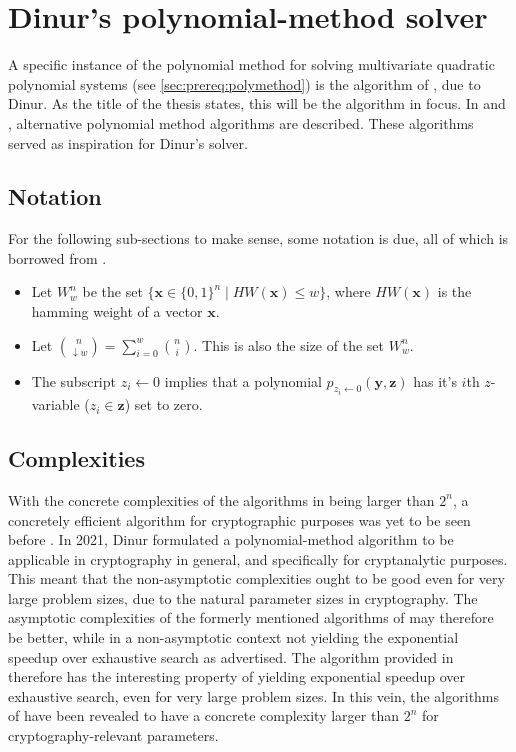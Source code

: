 \section{Dinur's polynomial-method solver} \label{sec:dinur}

A specific instance of the polynomial method for solving multivariate quadratic polynomial systems (see \cref{sec:prereq:polymethod}) is the algorithm of \cite{eurocrypt-2021-30841}, due to Dinur. As the title of the thesis states, this will be the algorithm in focus. In \cite{doi:10.1137/1.9781611974782.143} and \cite{Williams2014ThePM}, alternative polynomial method algorithms are described. These algorithms served as inspiration for Dinur's solver.

\subsection{Notation} \label{sec:dinur:notation}

For the following sub-sections to make sense, some notation is due, all of which is borrowed from \cite{eurocrypt-2021-30841}.
\begin{itemize}
    \item Let $W^n_w$ be the set $\{\mathbf{x} \in \{0, 1\}^n \mid HW(\mathbf{x}) \leq w \}$, where $HW(\mathbf{x})$ is the hamming weight of a vector $\mathbf{x}$. 
    \item Let $\binom{n}{\downarrow w} = \sum^w_{i = 0} \binom{n}{i}$. This is also the size of the set $W^n_w$.
    \item The subscript $z_i \leftarrow 0$ implies that a polynomial $p_{z_i \leftarrow 0}(\mathbf{y},\mathbf{z})$ has it's $i$th $z$-variable ($z_i \in \mathbf{z}$) set to zero.
\end{itemize}

\subsection{Complexities}

With the concrete complexities of the algorithms in \cite{doi:10.1137/1.9781611974782.143, Williams2014ThePM} being larger than $2^n$, a concretely efficient algorithm for cryptographic purposes was yet to be seen before \cite{eurocrypt-2021-30841}. In 2021, Dinur formulated a polynomial-method algorithm to be applicable in cryptography in general, and specifically for cryptanalytic purposes. This meant that the non-asymptotic complexities ought to be good even for very large problem sizes, due to the natural parameter sizes in cryptography. The asymptotic complexities of the formerly mentioned algorithms of \cite{doi:10.1137/1.9781611974782.143, Williams2014ThePM} may therefore be better, while in a non-asymptotic context not yielding the exponential speedup over exhaustive search as advertised. The algorithm provided in \cite{eurocrypt-2021-30841} therefore has the interesting property of yielding exponential speedup over exhaustive search, even for very large problem sizes. In this vein, the algorithms of \cite{doi:10.1137/1.9781611974782.143, Williams2014ThePM} have been revealed to have a concrete complexity larger than $2^n$ for cryptography-relevant parameters.

